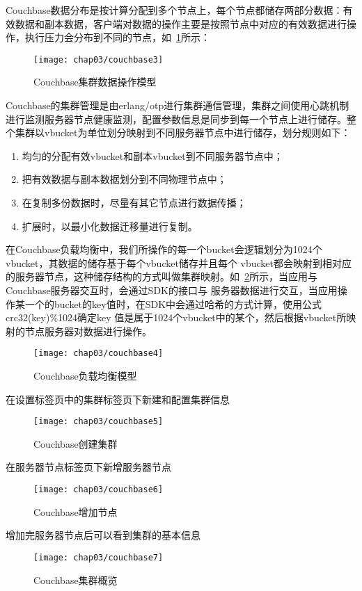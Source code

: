 Couchbase数据分布是按计算分配到多个节点上，每个节点都储存两部分数据：有效数据和副本数据，客户端对数据的操作主要是按照节点中对应的有效数据进行操作，执行压力会分布到不同的节点，如~\ref{fig:couchbase3}所示：
\begin{figure}[H] %
  \centering
  \texttt{[image: chap03/couchbase3]}
  \caption{Couchbase集群数据操作模型}
  \label{fig:couchbase3}
\end{figure}
Couchbase的集群管理是由erlang/otp进行集群通信管理，集群之间使用心跳机制进行监测服务器节点健康监测，配置参数信息是同步到每一个节点上进行储存。整个集群以vbucket为单位划分映射到不同服务器节点中进行储存，划分规则如下：
\begin{enumerate}
\item 均匀的分配有效vbucket和副本vbucket到不同服务器节点中；
\item 把有效数据与副本数据划分到不同物理节点中；
\item 在复制多份数据时，尽量有其它节点进行数据传播；
\item 扩展时，以最小化数据迁移量进行复制。
\end{enumerate}

在Couchbase负载均衡中，我们所操作的每一个bucket会逻辑划分为1024个vbucket，其数据的储存基于每个vbucket储存并且每个 vbucket都会映射到相对应的服务器节点，这种储存结构的方式叫做集群映射。如~\ref{fig:couchbase4}所示，当应用与Couchbase服务器交互时，会通过SDK的接口与 服务器数据进行交互，当应用操作某一个的bucket的key值时，在SDK中会通过哈希的方式计算，使用公式crc32(key)\%1024确定key 值是属于1024个vbucket中的某个，然后根据vbucket所映射的节点服务器对数据进行操作。
\begin{figure}[H] %
  \centering
  \texttt{[image: chap03/couchbase4]}
  \caption{Couchbase负载均衡模型}
  \label{fig:couchbase4}
\end{figure}
在设置标签页中的集群标签页下新建和配置集群信息
\begin{figure}[H] %
  \centering
  \texttt{[image: chap03/couchbase5]}
  \caption{Couchbase创建集群}
  \label{fig:couchbase5}
\end{figure}
在服务器节点标签页下新增服务器节点
\begin{figure}[H] %
  \centering
  \texttt{[image: chap03/couchbase6]}
  \caption{Couchbase增加节点}
  \label{fig:couchbase6}
\end{figure}
增加完服务器节点后可以看到集群的基本信息
\begin{figure}[H] %
  \centering
  \texttt{[image: chap03/couchbase7]}
  \caption{Couchbase集群概览}
  \label{fig:couchbase7}
\end{figure}

